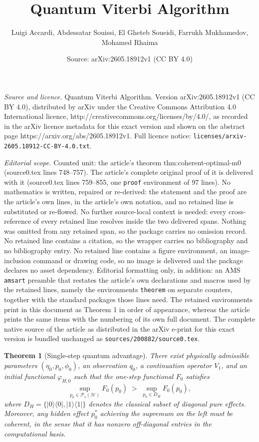 \documentclass[10pt,a4paper]{amsart}
\title{Quantum Viterbi Algorithm}
\author{Luigi Accardi, Abdessatar Souissi, El Gheteb Soueidi, Farrukh Mukhamedov, Mohamed Rhaima}
\date{Source: arXiv:2605.18912v1 (CC BY 4.0)}
\newtheorem{theorem}{Theorem}
\begin{document}
\maketitle

\noindent\emph{Source and licence.} Quantum Viterbi Algorithm. Version arXiv:2605.18912v1 (CC BY 4.0), distributed by arXiv under the Creative Commons Attribution 4.0 International licence, http://creativecommons.org/licenses/by/4.0/, as recorded in the arXiv licence metadata for this exact version and shown on the abstract page https://arxiv.org/abs/2605.18912v1. Full licence notice: \texttt{licenses/arxiv-2605.18912-CC-BY-4.0.txt}.\par\smallskip

\noindent\textit{Editorial scope.} Counted unit: the article's theorem thm:coherent-optimal-m0 (source0.tex lines 748--757). The article's complete original proof of it is delivered with it (source0.tex lines 759--855, one \texttt{proof} environment of 97 lines). No mathematics is written, repaired or re-derived: the statement and the proof are the article's own lines, in the article's own notation, and no retained line is substituted or re-flowed.  No further source-local context is needed: every cross-reference of every retained line resolves inside the two delivered spans.  Nothing was omitted from any retained span, so the package carries no omission record.  No retained line contains a citation, so the wrapper carries no bibliography and no bibliography entry.  No retained line contains a figure environment, an image-inclusion command or drawing code, so no image is delivered and the package declares no asset dependency.  Editorial formatting only, in addition: an AMS \texttt{amsart} preamble that restates the article's own declarations and macros used by the retained lines, namely the environments \texttt{theorem} on separate counters, together with the standard packages those lines need.  The retained environments print in this document as Theorem 1 in order of appearance, whereas the article prints the same items with the numbering of its own full document.  The complete native source of the article as distributed in the arXiv e-print for this exact version is bundled unchanged as \texttt{sources/200882/source0.tex}.
\begin{theorem}[Single-step quantum advantage]
\label{thm:coherent-optimal-m0}
There exist physically admissible parameters \((\eta_0,p_0,\phi_0)\), an observation \(q_0\), a continuation operator \(V_1\), and an initial functional \(\varphi_{H,0}\) such that the one-step functional \(F_0\) satisfies
\[
\sup_{p_0\in\mathcal{P}_{1}(\mathcal{H})} F_0(p_0)
\;>\;
\sup_{p_0\in D_H} F_0(p_0),
\]
where \(D_H=\{|0\rangle\langle0|,|1\rangle\langle1|\}\) denotes the classical subset of diagonal pure effects. Moreover, any hidden effect \(p_0^*\) achieving the supremum on the left must be coherent, in the sense that it has nonzero off-diagonal entries in the computational basis.
\end{theorem}
\end{document}
